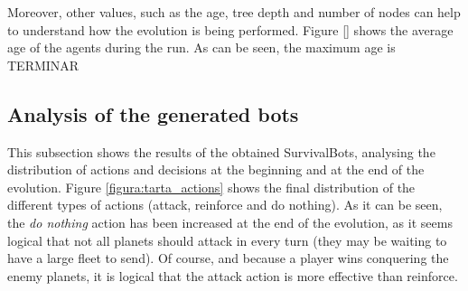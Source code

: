 \documentclass[conference]{IEEEtran}
\begin{document}
Moreover, other values, such as the age, tree depth and number of
nodes can help to understand how the evolution is being
performed. Figure \ref{} shows the average age of the agents during
the run. As can be seen, the maximum age is TERMINAR










\subsection{Analysis of the generated bots}
\label{subsec:analysisbots}
This subsection shows the results of the obtained SurvivalBots,
analysing the distribution of actions and decisions at the beginning
and at the end of the evolution. Figure \ref{figura:tarta_actions}
shows the final distribution of the different types of actions
(attack, reinforce and do nothing). As it can be seen, %
 the {\em do
  nothing} action has been increased %
at the end of the evolution, as
it seems logical that not all planets should attack in every turn
(they may be waiting to have a large fleet to send). Of course, and
because a player wins conquering the enemy planets, it is logical that
the attack action is more effective than reinforce.
\end{document}
